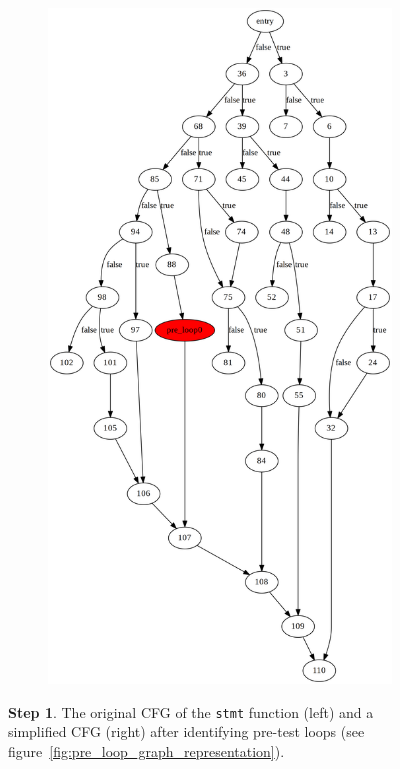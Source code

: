 \begin{figure}[htbp]
\begin{subfigure}[ht]{0.45\textwidth}
		\includegraphics[width=\textwidth]{inc/appendices/control_flow_analysis_example/step1_after.png}
	\end{subfigure}
	\caption{\textbf{Step 1}. The original CFG of the \texttt{stmt} function (left) and a simplified CFG (right) after identifying pre-test loops (see figure~\ref{fig:pre_loop_graph_representation}).}
	\label{fig:step_1}
\end{figure}

